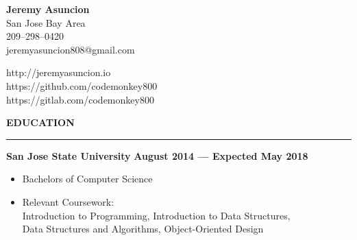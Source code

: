 \documentclass[10pt, oneside]{letter}
\newcommand{\linespaceshit} {
    \vspace{0.05in}
    \hrule
    \vspace{0.05in}
}
\begin{document}
    \begin{minipage}[t]{11cm}
        \flushleft
        \textbf{Jeremy Asuncion} \\
        San Jose Bay Area \\
        209--298--0420 \\
        jeremyasuncion808@gmail.com \\
    \end{minipage}
    \begin{minipage}[t]{7cm}
        \flushright
        http://jeremyasuncion.io \\
        https://github.com/codemonkey800 \\
        https://gitlab.com/codemonkey800 \\
    \end{minipage}

    \vspace{0.1in}

    \textbf{EDUCATION}
    \linespaceshit
        \begin{adjustwidth}{0.1in}{0pt}
            \textbf{San Jose State University} \hfill \textbf{August 2014 --- Expected May 2018}
            \begin{itemize}
                \item Bachelors of Computer Science
                \item Relevant Coursework: \\
                    \hspace*{0.5in} Introduction to Programming, Introduction to Data Structures, \\
                    \hspace*{0.5in} Data Structures and Algorithms, Object-Oriented Design
            \end{itemize}
        \end{adjustwidth}
\end{document}
